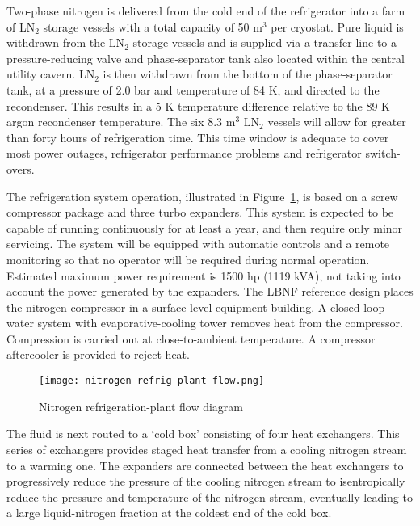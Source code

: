 Two-phase nitrogen is delivered from the cold end of the refrigerator 
into a farm of  LN$_2$ storage vessels with a total capacity of 50 m$^3$ per cryostat. 
Pure liquid is withdrawn from the LN$_2$ storage vessels and is supplied 
via a transfer line to a pressure-reducing valve and phase-separator tank 
also located within the central utility cavern. LN$_2$ is then withdrawn from the bottom 
of the phase-separator tank, at a pressure of 2.0 bar and temperature of 
84 K, and directed to the recondenser. This results in a 5 K temperature 
difference relative to the 89 K argon recondenser temperature. The 
six 8.3 m$^3$ LN$_2$ vessels will allow for greater than forty hours 
of refrigeration time. This time window is adequate to cover most power 
outages, refrigerator performance problems and refrigerator switch-overs.

The refrigeration system operation, illustrated in Figure~\ref{fig:LN2-refrigerator-flow}, 
is based on a screw compressor package and three turbo expanders. 
This system is expected to be capable of running  
continuously for at least a year, and then require only 
minor servicing. The system will be equipped with 
automatic controls and a remote monitoring so that no operator 
will be required during normal operation. 
Estimated maximum power requirement is 1500 hp (1119 kVA), 
not taking into account the power generated by the expanders.  
The LBNF reference design places the nitrogen compressor in 
a surface-level equipment building. A closed-loop water system 
with evaporative-cooling tower removes heat from the compressor. 
Compression is carried out at close-to-ambient temperature. 
A compressor aftercooler is provided to reject heat. 

\begin{figure}[htbp]
\centering
\texttt{[image: nitrogen-refrig-plant-flow.png]}
\caption{Nitrogen refrigeration-plant flow diagram}
\label{fig:LN2-refrigerator-flow}
\end{figure}

The fluid is next routed to a `cold box' consisting of four heat exchangers.  
This series of exchangers provides staged heat transfer from a cooling 
nitrogen stream to a warming one.  The expanders are connected between 
the heat exchangers to progressively reduce the pressure of the cooling 
nitrogen stream to isentropically reduce the pressure and temperature of the
nitrogen stream, eventually leading to a large liquid-nitrogen fraction 
at the coldest end of the cold box. 

